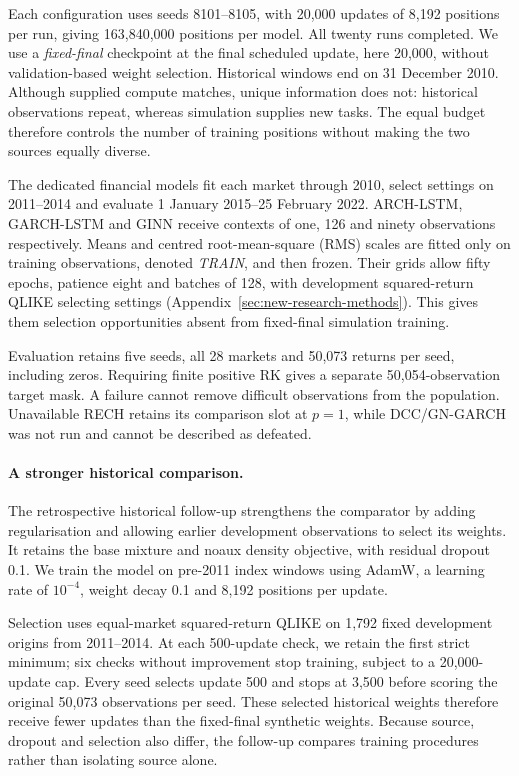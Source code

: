 Each configuration uses seeds 8101--8105, with 20,000 updates of 8,192 positions per run, giving 163,840,000 positions per model. All twenty runs completed. We use a \emph{fixed-final} checkpoint at the final scheduled update, here 20,000, without validation-based weight selection. Historical windows end on 31 December 2010. Although supplied compute matches, unique information does not: historical observations repeat, whereas simulation supplies new tasks. The equal budget therefore controls the number of training positions without making the two sources equally diverse.

The dedicated financial models fit each market through 2010, select settings on 2011--2014 and evaluate 1 January 2015--25 February 2022. ARCH-LSTM, GARCH-LSTM and GINN receive contexts of one, 126 and ninety observations respectively. Means and centred root-mean-square (RMS) scales are fitted only on training observations, denoted \emph{TRAIN}, and then frozen. Their grids allow fifty epochs, patience eight and batches of 128, with development squared-return QLIKE selecting settings (Appendix~\ref{sec:new-research-methods}). This gives them selection opportunities absent from fixed-final simulation training.

Evaluation retains five seeds, all 28 markets and 50,073 returns per seed, including zeros. Requiring finite positive RK gives a separate 50,054-observation target mask. A failure cannot remove difficult observations from the population. Unavailable RECH retains its comparison slot at $p=1$, while DCC/GN-GARCH was not run and cannot be described as defeated.

\paragraph{A stronger historical comparison.}
The retrospective historical follow-up strengthens the comparator by adding regularisation and allowing earlier development observations to select its weights. It retains the base mixture and noaux density objective, with residual dropout 0.1. We train the model on pre-2011 index windows using AdamW, a learning rate of $10^{-4}$, weight decay 0.1 and 8,192 positions per update.

Selection uses equal-market squared-return QLIKE on 1,792 fixed development origins from 2011--2014. At each 500-update check, we retain the first strict minimum; six checks without improvement stop training, subject to a 20,000-update cap. Every seed selects update 500 and stops at 3,500 before scoring the original 50,073 observations per seed. These selected historical weights therefore receive fewer updates than the fixed-final synthetic weights. Because source, dropout and selection also differ, the follow-up compares training procedures rather than isolating source alone.

